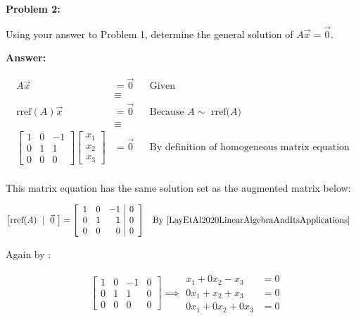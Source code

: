 \documentclass[10pt,letterpaper,final]{report}
\newcommand{\reason}[1]{&& \text{#1}}
\begin{document}
\pagebreak

\noindent\textbf{Problem 2:}
\medskip

Using your answer to Problem 1, determine the general solution of $A\vec{x} = \vec{0}$.

\medskip
\noindent\textbf{Answer:}
\medskip

\begin{align*}
  A\vec{x}                       & = \vec{0} \reason{Given}                                     \\[1ex]
                                 & \equiv                                                       \\
  \text{rref}(A)\vec{x}          & = \vec{0} \reason{Because $A \sim$ rref($A$)}                \\[1ex]
                                 & \equiv                                                       \\
  \begin{bmatrix}
    1 & 0 & -1 \\
    0 & 1 & 1  \\
    0 & 0 & 0
  \end{bmatrix}\begin{bmatrix}
                 x_1 \\
                 x_2 \\
                 x_3
               \end{bmatrix} & = \vec{0}  \reason{By definition of homogeneous matrix equation} \\[1ex]
\end{align*}

This matrix equation has the same solution set as the augmented matrix below:

\begin{align*}
  \left[\text{rref}(A)\ \mid\ \vec{0}\ \right] & =
  \left[\begin{array}{rrr|r}
      1 & 0 & -1 & 0 \\
      0 & 1 & 1  & 0 \\
      0 & 0 & 0  & 0
    \end{array}\right] \reason{By \cite[Theorem~1.3, p.~38]{LayEtAl2020LinearAlgebraAndItsApplications}}
\end{align*}

Again by \cite[Theorem~1.3, p.~38]{LayEtAl2020LinearAlgebraAndItsApplications}:

\begin{align*}
   & \left[\begin{array}{rrr|r}
         1 & 0 & -1 & 0 \\
         0 & 1 & 1  & 0 \\
         0 & 0 & 0  & 0
       \end{array}\right] \implies \begin{aligned}
                                     x_1 + 0x_2 - x_3   & = 0 \\
                                     0x_1 + x_2 + x_3   & = 0 \\
                                     0x_1 + 0x_2 + 0x_3 & = 0
                                   \end{aligned}
\end{align*}
\end{document}
